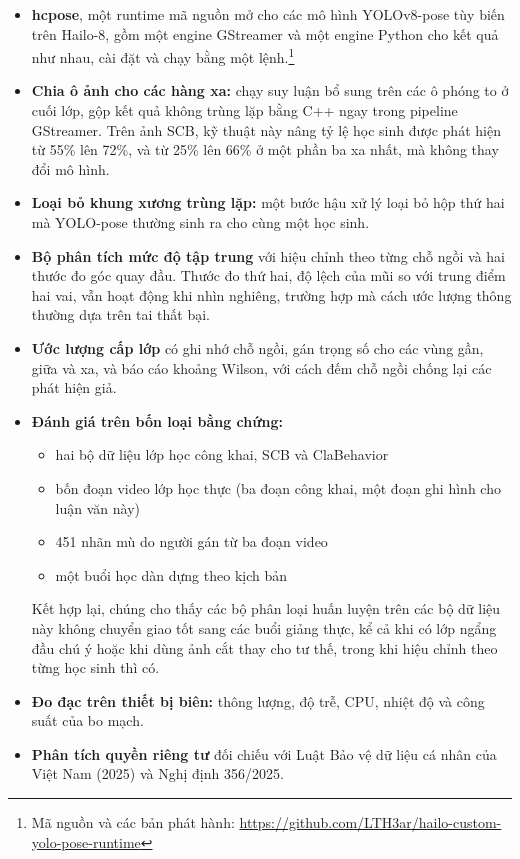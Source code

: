 \begin{itemize}
\tightlist
\item
  \textbf{hcpose}, một runtime mã nguồn mở cho các mô hình YOLOv8-pose tùy biến trên Hailo-8, gồm một engine GStreamer và một engine Python cho kết quả như nhau, cài đặt và chạy bằng một lệnh.\footnote{Mã nguồn và các bản phát hành: \url{https://github.com/LTH3ar/hailo-custom-yolo-pose-runtime}}
\item
  \textbf{Chia ô ảnh cho các hàng xa:} chạy suy luận bổ sung trên các ô phóng to ở cuối lớp, gộp kết quả không trùng lặp bằng C++ ngay trong pipeline GStreamer. Trên ảnh SCB, kỹ thuật này nâng tỷ lệ học sinh được phát hiện từ 55\% lên 72\%, và từ 25\% lên 66\% ở một phần ba xa nhất, mà không thay đổi mô hình.
\item
  \textbf{Loại bỏ khung xương trùng lặp:} một bước hậu xử lý loại bỏ hộp thứ hai mà YOLO-pose thường sinh ra cho cùng một học sinh.
\item
  \textbf{Bộ phân tích mức độ tập trung} với hiệu chỉnh theo từng chỗ ngồi và hai thước đo góc quay đầu. Thước đo thứ hai, độ lệch của mũi so với trung điểm hai vai, vẫn hoạt động khi nhìn nghiêng, trường hợp mà cách ước lượng thông thường dựa trên tai thất bại.
\item
  \textbf{Ước lượng cấp lớp} có ghi nhớ chỗ ngồi, gán trọng số cho các vùng gần, giữa và xa, và báo cáo khoảng Wilson, với cách đếm chỗ ngồi chống lại các phát hiện giả.
\item
  \textbf{Đánh giá trên bốn loại bằng chứng:}

  \begin{itemize}
  \tightlist
  \item
    hai bộ dữ liệu lớp học công khai, SCB và ClaBehavior
  \item
    bốn đoạn video lớp học thực (ba đoạn công khai, một đoạn ghi hình cho luận văn này)
  \item
    451 nhãn mù do người gán từ ba đoạn video
  \item
    một buổi học dàn dựng theo kịch bản
  \end{itemize}

  Kết hợp lại, chúng cho thấy các bộ phân loại huấn luyện trên các bộ dữ liệu này không chuyển giao tốt sang các buổi giảng thực, kể cả khi có lớp ngẩng đầu chú ý hoặc khi dùng ảnh cắt thay cho tư thế, trong khi hiệu chỉnh theo từng học sinh thì có.
\item
  \textbf{Đo đạc trên thiết bị biên:} thông lượng, độ trễ, CPU, nhiệt độ và công suất của bo mạch.
\item
  \textbf{Phân tích quyền riêng tư} đối chiếu với Luật Bảo vệ dữ liệu cá nhân của Việt Nam (2025) và Nghị định 356/2025.
\end{itemize}

